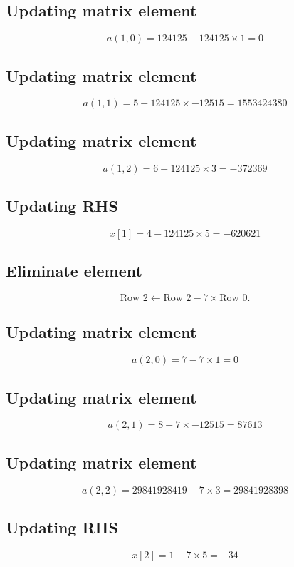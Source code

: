 \documentclass{article}
\begin{document}
\subsection*{ \vspace{1em} Updating matrix element}
\[
a(1,0 ) = 124125 - 124125 \times 1 = 0
\]
\subsection*{ \vspace{1em} Updating matrix element}
\[
a(1,1 ) = 5 - 124125 \times -12515 = 1553424380
\]
\subsection*{ \vspace{1em} Updating matrix element}
\[
a(1,2 ) = 6 - 124125 \times 3 = -372369
\]
\subsection*{ \vspace{1em} Updating RHS}
\[
x[1] = 4 - 124125 \times 5 = -620621
\]
\subsection*{ \vspace{1em} Eliminate element}
\[
\text{Row } 2 \leftarrow \text{Row }2 - 7 \times \text{Row } 0.
\]
\subsection*{ \vspace{1em} Updating matrix element}
\[
a(2,0 ) = 7 - 7 \times 1 = 0
\]
\subsection*{ \vspace{1em} Updating matrix element}
\[
a(2,1 ) = 8 - 7 \times -12515 = 87613
\]
\subsection*{ \vspace{1em} Updating matrix element}
\[
a(2,2 ) = 29841928419 - 7 \times 3 = 29841928398
\]
\subsection*{ \vspace{1em} Updating RHS}
\[
x[2] = 1 - 7 \times 5 = -34
\]
\end{document}
